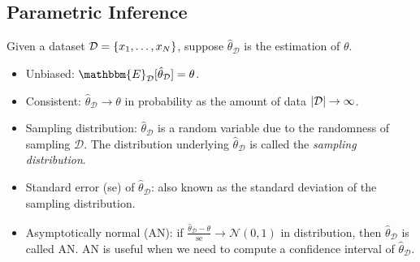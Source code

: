      

\subsection{Parametric Inference}
    Given a dataset $\mathcal{D} = \{ x_1, \ldots, x_N \}$, suppose $\hat{\theta}_{\mathcal{D}}$ is the estimation of $\theta$.
    \begin{itemize}
        \item Unbiased: $\mathbbm{E}_{\mathcal{D}}[\hat{\theta}_\mathcal{D} ] = \theta$.
        \item Consistent: $\hat{\theta}_\mathcal{D} \rightarrow \theta$ in probability as the amount of data $| \mathcal{D} | \rightarrow \infty$.
        \item Sampling distribution: $\hat{\theta}_\mathcal{D}$ is a random variable due to the randomness of sampling $\mathcal{D}$.
        The distribution underlying $\hat{\theta}_\mathcal{D}$ is called the \emph{sampling distribution}.
        \item Standard error (se) of $\hat{\theta}_{\mathcal{D}}$: also known as the standard deviation of the sampling distribution. 
        \item Asymptotically normal (AN): if $\frac{\hat{\theta}_\mathcal{D} - \theta}{\text{se}} \rightarrow \mathcal{N}(0, 1)$ in distribution, then $\hat{\theta}_\mathcal{D}$ is called AN.
        AN is useful when we need to compute a confidence interval of $\hat{\theta}_\mathcal{D}$.
    \end{itemize}

